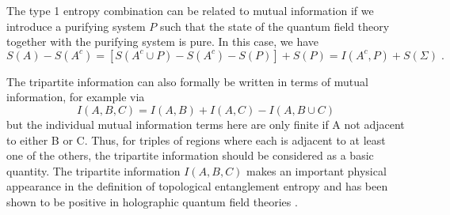 \documentclass[12pt]{article}
\theoremstyle{definition}
\begin{document}
The type 1 entropy combination can be related to mutual information if we introduce a purifying system $P$ such that the state of the quantum field theory together with the purifying system is pure. In this case, we have
\[
S(A) - S(A^c) = [S(A^c \cup P) - S(A^c) - S(P)] + S(P) = I(A^c,P) + S(\Sigma) \; .
\]

The tripartite information can also formally be written in terms of mutual information, for example via
\[
I(A,B,C) = I(A,B) + I(A,C) - I(A , B \cup C) 
\]
but the individual mutual information terms here are only finite if A not adjacent to either B or C. Thus, for triples of regions where each is adjacent to at least one of the others, the tripartite information should be considered as a basic quantity. The tripartite information  $I(A,B,C)$ makes an important physical appearance in the definition of topological entanglement entropy \cite{KitaevPreskill2006,LevinWen2006} and has been shown to be positive in holographic quantum field theories \cite{hayden2013holographic}.
\end{document}
